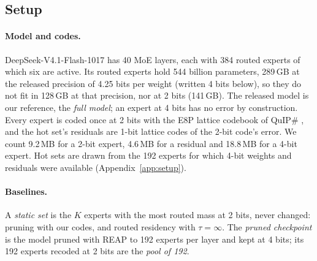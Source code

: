 \documentclass[11pt]{article}
\begin{document}
\subsection{Setup}
\label{sec:setup}

\paragraph{Model and codes.} DeepSeek-V4.1-Flash-1017 \citep{deepseek2026v41flash} has 40 MoE
layers, each with 384 routed experts of which six are active. Its routed experts hold 544
billion parameters, 289\,GB at the released precision of 4.25 bits per weight (written 4 bits
below), so they do not fit in 128\,GB at that precision, nor at 2 bits (141\,GB). The released
model is our reference, the \emph{full model}; an expert at 4 bits has no error by
construction. Every expert is coded once at 2 bits with the E8P lattice codebook of QuIP\#
\citep{tseng2024quipsharp}, and the hot set's residuals are 1-bit lattice codes of the 2-bit
code's error. We count 9.2\,MB for a 2-bit expert, 4.6\,MB for a residual and 18.8\,MB for a 4-bit expert. Hot sets are drawn from the 192 experts for which 4-bit weights and residuals were available (Appendix~\ref{app:setup}).

\paragraph{Baselines.} A \emph{static set} is the $K$ experts with the most routed mass at 2
bits, never changed: pruning with our codes, and routed residency with $\tau=\infty$. The
\emph{pruned checkpoint} is the model pruned with REAP \citep{lasby2025reap} to 192 experts per
layer and kept at 4 bits; its 192 experts recoded at 2 bits are the \emph{pool of 192}.
\end{document}
